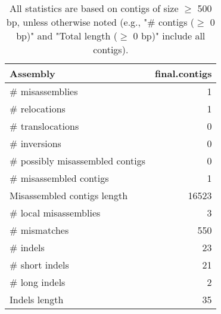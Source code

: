 \documentclass[12pt,a4paper]{article}
\begin{document}
\begin{table}[ht]
\begin{center}
\caption{All statistics are based on contigs of size $\geq$ 500 bp, unless otherwise noted (e.g., "\# contigs ($\geq$ 0 bp)" and "Total length ($\geq$ 0 bp)" include all contigs).}
\begin{tabular}{|l*{1}{|r}|}
\hline
Assembly & final.contigs \\ \hline
\# misassemblies & 1 \\ \hline
\hspace{5mm}\# relocations & 1 \\ \hline
\hspace{5mm}\# translocations & 0 \\ \hline
\hspace{5mm}\# inversions & 0 \\ \hline
\# possibly misassembled contigs & 0 \\ \hline
\# misassembled contigs & 1 \\ \hline
Misassembled contigs length & 16523 \\ \hline
\# local misassemblies & 3 \\ \hline
\# mismatches & 550 \\ \hline
\# indels & 23 \\ \hline
\hspace{5mm}\# short indels & 21 \\ \hline
\hspace{5mm}\# long indels & 2 \\ \hline
Indels length & 35 \\ \hline
\end{tabular}
\end{center}
\end{table}
\end{document}

